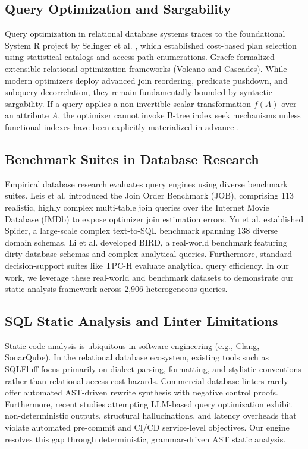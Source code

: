 \documentclass[conference]{IEEEtran}
\begin{document}
\subsection{Query Optimization and Sargability}
Query optimization in relational database systems traces to the foundational System R project by Selinger et al. \cite{selinger1979access}, which established cost-based plan selection using statistical catalogs and access path enumerations. Graefe \cite{graefe1993query} formalized extensible relational optimization frameworks (Volcano and Cascades). While modern optimizers deploy advanced join reordering, predicate pushdown, and subquery decorrelation, they remain fundamentally bounded by syntactic sargability. If a query applies a non-invertible scalar transformation $f(A)$ over an attribute $A$, the optimizer cannot invoke B-tree index seek mechanisms unless functional indexes have been explicitly materialized in advance \cite{karwin2010sql}.

\subsection{Benchmark Suites in Database Research}
Empirical database research evaluates query engines using diverse benchmark suites. Leis et al. \cite{leis2015good} introduced the Join Order Benchmark (JOB), comprising 113 realistic, highly complex multi-table join queries over the Internet Movie Database (IMDb) to expose optimizer join estimation errors. Yu et al. \cite{yu2018spider} established Spider, a large-scale complex text-to-SQL benchmark spanning 138 diverse domain schemas. Li et al. \cite{li2024bird} developed BIRD, a real-world benchmark featuring dirty database schemas and complex analytical queries. Furthermore, standard decision-support suites like TPC-H \cite{tpch} evaluate analytical query efficiency. In our work, we leverage these real-world and benchmark datasets to demonstrate our static analysis framework across 2,906 heterogeneous queries.

\subsection{SQL Static Analysis and Linter Limitations}
Static code analysis is ubiquitous in software engineering (e.g., Clang, SonarQube). In the relational database ecosystem, existing tools such as SQLFluff \cite{sqlfluff} focus primarily on dialect parsing, formatting, and stylistic conventions rather than relational access cost hazards. Commercial database linters rarely offer automated AST-driven rewrite synthesis with negative control proofs. Furthermore, recent studies attempting LLM-based query optimization exhibit non-deterministic outputs, structural hallucinations, and latency overheads that violate automated pre-commit and CI/CD service-level objectives. Our engine resolves this gap through deterministic, grammar-driven AST static analysis.
\end{document}
